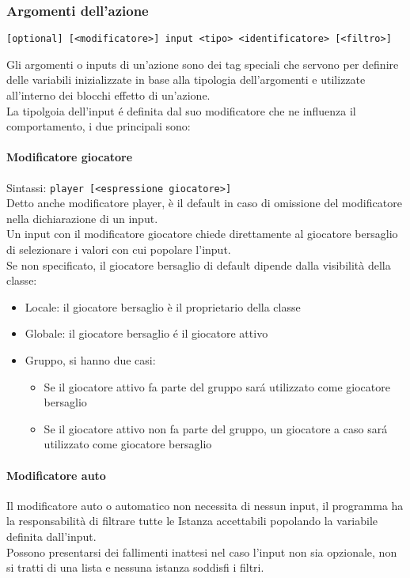 \subsubsection{Argomenti dell'azione}
\begin{verbatim}
[optional] [<modificatore>] input <tipo> <identificatore> [<filtro>]
\end{verbatim}
Gli argomenti o inputs di un’azione sono dei tag speciali che servono per definire delle variabili 
inizializzate in base alla tipologia dell’argomenti e utilizzate all’interno dei 
blocchi effetto di un’azione. \\
La tipolgoia dell'input é definita dal suo modificatore che ne influenza il comportamento, 
i due principali sono:

\paragraph{Modificatore giocatore}
Sintassi: \verb|player [<espressione giocatore>]| \\
Detto anche modificatore player, è il default in caso di omissione del modificatore nella
dichiarazione di un input. \\
Un input con il modificatore giocatore chiede direttamente al giocatore bersaglio di 
selezionare i valori con cui popolare l'input. \\
Se non specificato, il giocatore bersaglio di default dipende dalla visibilità della classe:
\begin{itemize}
    \item Locale: il giocatore bersaglio è il proprietario della classe
    \item Globale: il giocatore bersaglio é il giocatore attivo 
    \item {
        Gruppo, si hanno due casi:
        \begin{itemize}
            \item Se il giocatore attivo fa parte del gruppo sará utilizzato come giocatore bersaglio
            \item Se il giocatore attivo non fa parte del gruppo, un giocatore a caso sará utilizzato come giocatore bersaglio
        \end{itemize}
    }
\end{itemize}

\paragraph{Modificatore auto}
Il modificatore auto o automatico non necessita di nessun input, il programma ha la responsabilità di
filtrare tutte le Istanza accettabili popolando la variabile definita dall'input. \\
Possono presentarsi dei fallimenti inattesi nel caso l'input non sia opzionale,
non si tratti di una lista e nessuna istanza soddisfi i filtri.

